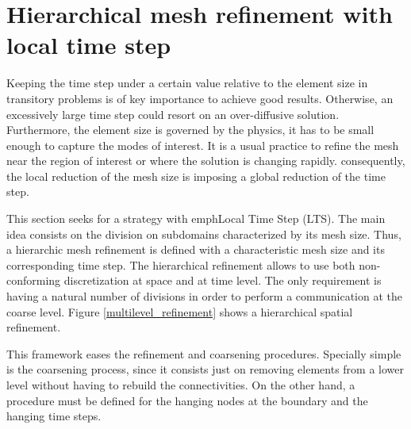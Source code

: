 
\chapter{Hierarchical mesh refinement with local time step}
\label{mesh_refinement}


Keeping the time step under a certain value relative to the element size in transitory problems is of key importance to achieve good results. Otherwise, an excessively large time step could resort on an over-diffusive solution.
Furthermore, the element size is governed by the physics, it has to be small enough to capture the modes of interest. It is a usual practice to refine the mesh near the region of interest or where the solution is changing rapidly. consequently, the local reduction of the mesh size is imposing a global reduction of the time step.

This section seeks for a strategy with emph{Local Time Step} (LTS). The main idea consists on the division on subdomains characterized by its mesh size. Thus, a hierarchic mesh refinement is defined with a characteristic mesh size and its corresponding time step. The hierarchical refinement allows to use both non-conforming discretization at space and at time level. The only requirement is having a natural number of divisions in order to perform a communication at the coarse level. Figure \ref{multilevel_refinement} shows a hierarchical spatial refinement.

This framework eases the refinement and coarsening procedures. Specially simple is the coarsening process, since it consists just on removing elements from a lower level without having to rebuild the connectivities. On the other hand, a procedure must be defined for the hanging nodes at the boundary and the hanging time steps.



